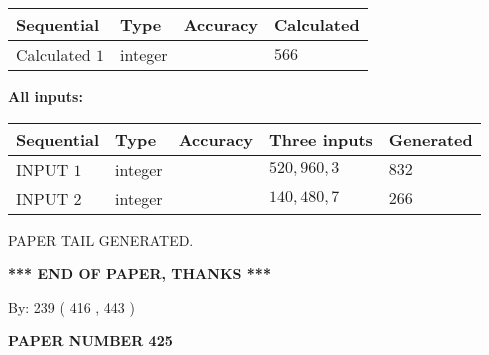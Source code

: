 \documentclass{ctexart}
\begin{document}
   
   
   
\noindent{}
   
   
  
  
\noindent\begin{tabular}{|l|l|l|l|}
\hline
 Sequential & Type & Accuracy & Calculated \\ 
\hline
 
 
  Calculated $  1 $ & integer &  & 
  $ 566 $ 
 \\  \hline  
 \end{tabular}
   
   
   
   
\noindent\vspace{0.1in}\hspace{-0.08in} {\textbf{\Large{All inputs: }}}
   
   
  
  
\noindent\begin{tabular}{|l|l|l|l|l|}
\hline
 Sequential & Type & Accuracy & Three inputs & Generated \\ 
\hline
 
 
  INPUT $  1 $ & integer &  & $
 520
 , 
 960
 , 
 3
 $ & $ 832 $ 
 \\  \hline  
 
 
  INPUT $  2 $ & integer &  & $
 140
 , 
 480
 , 
 7
 $ & $ 266 $ 
 \\  \hline  
 \end{tabular}
   
   
   
   
   
   
 \vspace{0.2in}
 
   
   
\vspace{2.0in} PAPER TAIL GENERATED.
   
   
   
   
\vspace{1.0in} 
{\textbf{\large{ *** END OF PAPER, THANKS *** }}} 
   
   
\hspace{1.0in} By: 
 239 ( 416 ,  443 )
   
   
   
   
\newpage 
\setcounter{page}{ 
   425001 } 
   
   
   
   
 {\textbf{ \Large{ PAPER NUMBER  425  }}}
   
\end{document}
